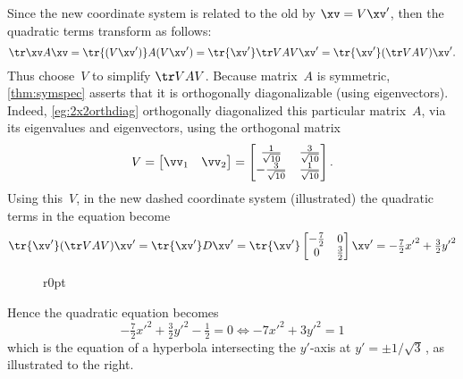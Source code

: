 \begin{example}
\begin{solution}
Since the new coordinate system is related to the old by \(\xv=V\xv'\), then the quadratic terms transform as follows: 
\begin{equation*}
\tr\xv A\xv
=\tr{(V\xv')} A(V\xv')
=\tr{\xv'}\tr VAV\xv'
=\tr{\xv'}(\tr VAV)\xv'.
\end{equation*}
Thus choose~\(V\) to simplify \(\tr VAV\).
Because matrix~\(A\) is symmetric, \cref{thm:symspec} asserts that it is orthogonally diagonalizable (using eigenvectors).
Indeed, \cref{eg:2x2orthdiag} orthogonally diagonalized this particular matrix~\(A\), via its eigenvalues and eigenvectors, using the orthogonal matrix
\begin{equation*}
V=\begin{bmatrix} \vv_1&\vv_2 \end{bmatrix}
=\begin{bmatrix} \frac1{\sqrt{10}} & \frac3{\sqrt{10}}
\\ -\frac3{\sqrt{10}}& \frac1{\sqrt{10}} \end{bmatrix}.
\end{equation*}
Using this~\(V\), in the new dashed coordinate system (illustrated) the quadratic terms in the equation become
\begin{equation*}
\tr{\xv'}(\tr VAV)\xv'
=\tr{\xv'}D\xv'
=\tr{\xv'}\begin{bmatrix} -\tfrac72&0\\0&\tfrac32 \end{bmatrix}\xv'
=-\tfrac72{x'}^2+\tfrac32{y'}^2
\end{equation*}

\begin{wrapfigure}r{0pt}  \end{wrapfigure}
Hence the quadratic equation becomes
\begin{equation*}
-\tfrac72{x'}^2+\tfrac32{y'}^2-\tfrac12=0
\iff -7{x'}^2+3{y'}^2=1
\end{equation*}
which is the equation of a hyperbola intersecting the \(y'\)-axis at \(y'=\pm1/\sqrt3\)\,, as illustrated to the right.
\aqed

\end{solution}
\end{example}





